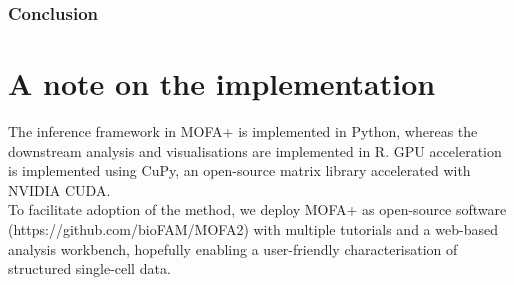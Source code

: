 \subsubsection{Conclusion}



\section{A note on the implementation}

The inference framework in MOFA+ is implemented in Python, whereas the downstream analysis and visualisations are implemented in R. GPU acceleration is implemented using CuPy\cite{Okuta2017}, an open-source matrix library accelerated with NVIDIA CUDA.\\
To facilitate adoption of the method, we deploy MOFA+ as open-source software (https://github.com/bioFAM/MOFA2) with multiple tutorials and a web-based analysis workbench, hopefully enabling a user-friendly characterisation of structured single-cell data.
